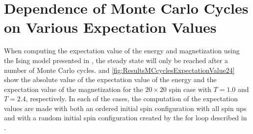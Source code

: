 \section{Dependence of Monte Carlo Cycles on Various Expectation Values}
\label{sec:ResultsMCcyclesExpectationValue}
When computing the expectation value of the energy and magnetization using the Ising model presented in , the steady state will only be reached after a number of Monte Carlo cycles.
 and \ref{fig:ResultsMCcyclesExpectationValue24} show the absolute value of the expectation value of the energy and the expectation value of the magnetization for the $20\times 20$ spin case with $T = 1.0$ and $T = 2.4$, respectively. 
In each of the cases, the computation of the expectation values are made with both an ordered initial spin configuration with all spin ups and with a random initial spin configuration created by the for loop described in .  
